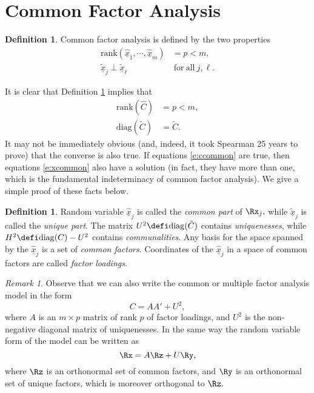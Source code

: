 \documentclass[12pt]{amsart}
\theoremstyle{definition}
\newtheorem{definition}[theorem]{Definition}
\theoremstyle{remark}
\newtheorem{remark}[theorem]{Remark}
\numberwithin{equation}{section}
\begin{document}
\section{Common Factor Analysis}\label{s:common}
%
\begin{definition}\label{d:common}
Common factor analysis is defined by the two properties
%
\begin{align}\label{e:xcommon}
\mathrm{rank}(\underline{\hat x}_1,\cdots,\underline{\hat x}_m)&=p<m,\\
\underline{\tilde x}_j\perp\underline{\tilde x}_\ell&\mathrm{\ for\ all\ }j,\ell.
\end{align}
%
\end{definition}
%
It is clear that Definition \ref{d:common} implies that
%
\begin{align}\label{e:ccommon}
\mathrm{rank}(\hat C)&=p<m,\\
\mathrm{diag}(\tilde C)&=\tilde C.
\end{align}
%
It may not be immediately obvious (and, indeed, it took Spearman 25 years to prove) that the
converse is also true. If equations \ref{e:ccommon} are true, then equations \ref{e:xcommon}
also have a solution (in fact, they have more than one, which is the fundamental
indeterminacy of common factor analysis). We give a simple proof of these facts below.
%
\begin{definition}\label{d:terms}
Random variable $\underline{\hat x}_j$ is called the \textit{common part}
of $\Rx_j,$ while $\underline{\tilde x}_j$ is called the \textit{unique part}.
The matrix $U^2\defi\mathrm{diag}(\tilde C)$ contains \textit{uniquenesses},
while $H^2\defi\mathrm{diag}(C)-U^2$ contains \textit{communalities}. Any basis
for the space spanned by the $\underline{\hat x}_j$ is a set of 
\textit{common factors}. Coordinates of the $\underline{\hat x}_j$ in
a space of common factors are called \textit{factor loadings}.
\end{definition}
%
\begin{remark}\label{r:mathform}
Observe that we can also write the common or multiple factor analysis model in the form
%
\begin{equation}\label{e:cmatform}
C=AA'+U^2,
\end{equation}
%
where $A$ is an $m\times p$ matrix of rank $p$ of factor loadings, 
and $U^2$ is the non-negative diagonal
matrix of uniquenesses. In the same way the random variable
form of the model can be written as
%
\begin{equation}\label{e:xmatform}
\Rx=A\Rz+U\Ry,
\end{equation}
%
where $\Rz$ is an orthonormal set of common factors, and $\Ry$
is an orthonormal set of unique factors, which is moreover
orthogonal to $\Rz.$
\end{remark}
\end{document}
